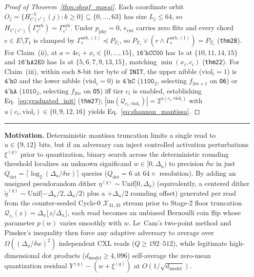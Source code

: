 \documentclass[10pt,twocolumn]{article}
\newcommand{\MidConnesRule}{%
  \par\vspace{4pt}\noindent\textcolor{black!25}{\rule{\textwidth}{0.4pt}}\par\vspace{4pt}%
}
\theoremstyle{spectralthm}
\begin{document}
\begin{proof}[Proof of Theorem~\ref{thm:sheaf_moesi}]
Each coordinate orbit $O_j = \{H_{C(e^*)}^{-k}(j) : k \ge 0\} \subseteq \{0,\ldots,63\}$ has size $L_j \le 64$, so $H_{C(e^*)}(\Gamma_{e^*}^{\mathrm{orb}}) = \Gamma_{e^*}^{\mathrm{orb}}$. Under $p_{\mathrm{phy}} = 0$, $e_{\mathrm{cut}}$ carries zero flits and every chord $e \in E \setminus T_1$ is clamped by $\Gamma_e^{\mathrm{orb},(1)} \preceq P_{T_1}$, so $P_{T_1} \vee (r \wedge \Gamma_e^{\mathrm{orb},(1)}) = P_{T_1}$ (\texttt{thm28}). For Claim~(ii), at $a = 4c_i + x_i \in \{0,\ldots,15\}$, $\texttt{16'hCC00}$ has 1s at $\{10,11,14,15\}$ and $\texttt{16'hA2E0}$ has 1s at $\{5,6,7,9,13,15\}$, matching $\min(x_i, c_i)$ (\texttt{thm22}). For Claim~(iii), within each 8-bit tier byte of \texttt{INIT}, the upper nibble ($\mathrm{viol}_i = 1$) is $\texttt{4'h0}$ and the lower nibble ($\mathrm{viol}_i = 0$) is $\texttt{4'hC}$ ($\texttt{1100}_2$, selecting $f_{2m+1}$ on \texttt{O6}) or $\texttt{4'hA}$ ($\texttt{1010}_2$, selecting $f_{2m}$ on \texttt{O5}) iff tier $c_i$ is enabled, establishing Eq.~\eqref{eq:graduated_init} (\texttt{thm27}); $|\mathrm{im}(\mathcal{Q}_{c_i,\mathrm{viol}_i})| = 2^{u(c_i,\mathrm{viol}_i)}$ with $u(c_i,\mathrm{viol}_i) \in \{0,9,12,16\}$ yields Eq.~\eqref{eq:shannon_mantissa}.
\end{proof}
\MidConnesRule
\noindent\textbf{Motivation.}\; Deterministic mantissa truncation limits a single read to $u \in \{9,12\}$ bits, but if an adversary can inject controlled activation perturbations $\xi^{(q)}$ prior to quantization, binary search across the deterministic rounding threshold localizes an unknown significand $w \in [0,\Delta_u)$ to precision $\delta w$ in just $Q_{\mathrm{det}} = \lceil\log_2(\Delta_u/\delta w)\rceil$ queries ($Q_{\mathrm{det}} = 6$ at $64\times$ resolution). By adding an unsigned pseudorandom dither $\eta^{(q)} \sim \mathrm{Unif}[0,\Delta_u)$ (equivalently, a centered dither $\tilde{\eta}^{(q)} \sim \mathrm{Unif}[-\Delta_u/2,\Delta_u/2)$ plus a $+\Delta_u/2$ rounding offset) generated per read from the counter-seeded Cycle-0 $\mathcal{X}_{31,33}$ stream prior to Stage-2 floor truncation $\mathcal{Q}_{c_i}(z) = \Delta_u \lfloor z/\Delta_u \rfloor$, each read becomes an unbiased Bernoulli coin flip whose parameter $p(w)$ varies smoothly with $w$. Le~Cam's two-point method and Pinsker's inequality then force any adaptive adversary to average over $\Omega((\Delta_u/\delta w)^2)$ independent CXL reads ($Q \ge 192$--$512$), while legitimate high-dimensional dot products ($d_{\mathrm{model}} \ge 4,096$) self-average the zero-mean quantization residual $Y^{(q)} - (w+\xi^{(q)})$ at $O(1/\sqrt{d_{\mathrm{model}}})$.
\end{document}
